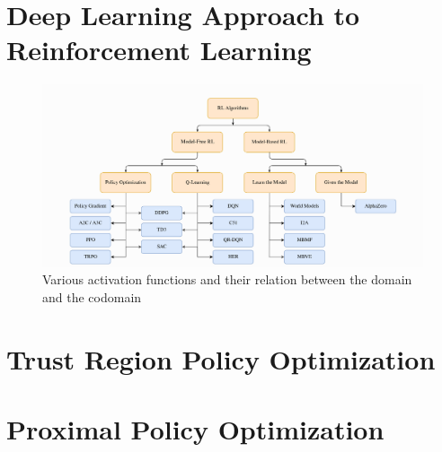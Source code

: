 \documentclass[draft,final]{vutinfth} %
\begin{document}




    \section{Deep Learning Approach to Reinforcement Learning}

    \begin{figure}[h]
        \centering
        \includegraphics[width=\textwidth]{figures/drl_taxonomy.png}
        \caption[]{Various activation functions and their relation between the domain and the codomain\protect\footnotemark}
        \label{fig:drl_taxonomy}
    \end{figure}



    \citep{francois-lavet_introduction_2018}
    \citep{aggarwal_neural_2018}


    \section{Trust Region Policy Optimization}\label{sec:trust-region-policy-optimization}


    \section{Proximal Policy Optimization}\label{sec:proximal-policy-optimization}
    \cite{schulman_proximal_2017}
\end{document}
